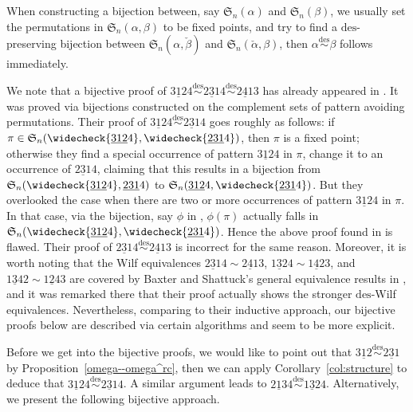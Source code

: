 \documentclass[11pt,reqno]{amsart}
\numberwithin{equation}{section}
\theoremstyle{plain}
\theoremstyle{definition}
\renewcommand{\S}{\mathfrak{S}}
\def\des{\mathrm{des}}
\begin{document}
When constructing a bijection between, say $\S_n(\alpha)$ and $\S_n(\beta)$, we usually set the permutations in $\S_n(\alpha,\beta)$ to be fixed points, and try to find a $\des$-preserving bijection between $\S_n(\alpha,\check{\beta})$ and $\S_n(\check{\alpha},\beta)$, then $\alpha \overset{\des}{\sim }\beta$ follows immediately.

We note that a bijective proof of $\underline{312}4 \overset{\des}{\sim }\underline{231}4\overset{\des}{\sim }\underline{241}3$ has already appeared in \cite{BDGZ19}. It was proved via bijections constructed on the complement sets of pattern avoiding permutations. Their proof of $\underline{312}4 \overset{\des}{\sim }\underline{231}4$ goes roughly as follows: if $\pi \in \S_n(\widecheck{\underline{312}4},\widecheck{\underline{231}4})$,
then $\pi$ is a fixed point; otherwise they find a special occurrence of pattern $\underline{312}4$ in $\pi$, change it to an occurrence of $\underline{231}4$, claiming that this results in a bijection from $\S_n(\widecheck{\underline{312}4},\underline{231}4)$ to $\S_n(\underline{312}4,\widecheck{\underline{231}4})$. But they overlooked the case when there are two or more occurrences of pattern $\underline{312}4$ in $\pi$. In that case, via the bijection, say $\phi$ in \cite{BDGZ19}, $\phi(\pi)$ actually falls in $\S_n(\widecheck{\underline{312}4},\widecheck{\underline{231}4})$. Hence the above proof found in \cite{BDGZ19} is flawed. Their proof of $\underline{231}4\overset{\des}{\sim }\underline{241}3$ is incorrect for the same reason. Moreover, it is worth noting that the Wilf equivalences $\underline{231}4\sim\underline{241}3$, $\underline{132}4\sim\underline{142}3$, and $\underline{134}2\sim\underline{124}3$ are covered by Baxter and Shattuck's general equivalence results in \cite[Thm.~6 and Thm.~9]{BS15}, and it was remarked there that their proof actually shows the stronger $\des$-Wilf equivalences. Nevertheless, comparing to their inductive approach, our bijective proofs below are described via certain algorithms and seem to be more explicit.

Before we get into the bijective proofs, we would like to point out that $\underline{312} \overset{\des}{\sim }\underline{231} $ by Proposition~\ref{omega--omega^rc}, then we can apply Corollary~\ref{col:structure} to deduce that $\underline{312}4 \overset{\des}{\sim }\underline{231}4$. A similar argument leads to $\underline{213}4 \overset{\des}{\sim }\underline{132}4$. Alternatively, we present the following bijective approach. 
\end{document}
